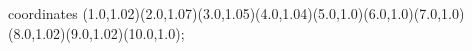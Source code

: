 					coordinates { (1.0,1.02)(2.0,1.07)(3.0,1.05)(4.0,1.04)(5.0,1.0)(6.0,1.0)(7.0,1.0)(8.0,1.02)(9.0,1.02)(10.0,1.0)};